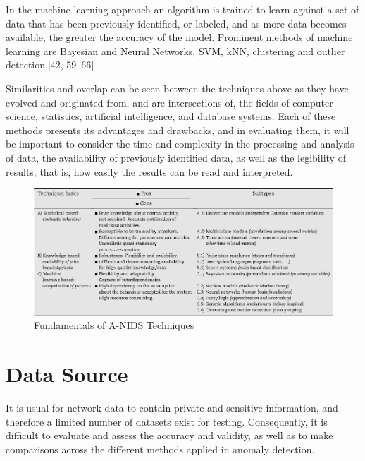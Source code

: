 \documentclass[11pt,]{article}
\begin{document}
In the machine learning approach an algorithm is trained to learn
against a set of data that has been previously identified, or labeled,
and as more data becomes available, the greater the accuracy of the
model. Prominent methods of machine learning are Bayesian and Neural
Networks, SVM, kNN, clustering and outlier detection.{[}42, 59--66{]}

Similarities and overlap can be seen between the techniques above as
they have evolved and originated from, and are intersections of, the
fields of computer science, statistics, artificial intelligence, and
database systems. Each of these methods presents its advantages and
drawbacks, and in evaluating them, it will be important to consider the
time and complexity in the processing and analysis of data, the
availability of previously identified data, as well as the legibility of
results, that is, how easily the results can be read and interpreted.

\begin{figure}

{\centering \includegraphics{thesis_files/figure-latex/unnamed-chunk-11-1} 

}

\caption{Fundamentals of A-NIDS Techniques}\label{fig:unnamed-chunk-11}
\end{figure}

\clearpage

\section{Data Source}\label{data-source}

It is usual for network data to contain private and sensitive
information, and therefore a limited number of datasets exist for
testing. Consequently, it is difficult to evaluate and assess the
accuracy and validity, as well as to make comparisons across the
different methods applied in anomaly detection.
\end{document}
